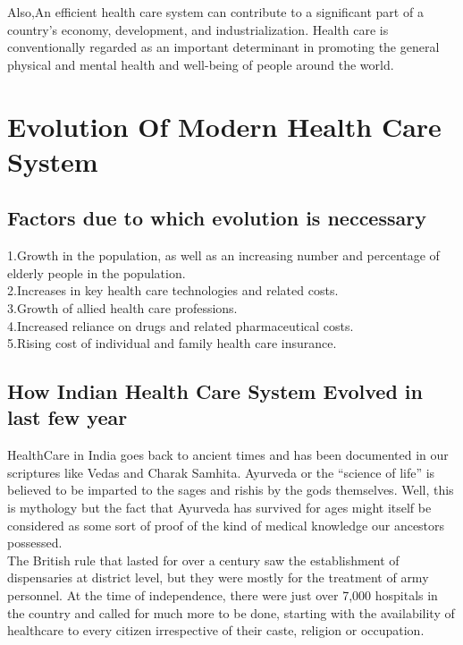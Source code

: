 \documentclass[12pt]{report}
\begin{document}
Also,An efficient health care system can contribute to a significant part of a country's economy, development, and industrialization. Health care is conventionally regarded as an important determinant in promoting the general physical and mental health and well-being of people around the world.

\section{Evolution Of Modern Health Care System}

\subsection{Factors due to which evolution is neccessary}

1.Growth in the population, as well as an increasing number and percentage of elderly people in the population.\\
2.Increases in key health care technologies and related costs.\\
3.Growth of allied health care professions.\\
4.Increased reliance on drugs and related pharmaceutical costs.\\
5.Rising cost of individual and family health care insurance.

\clearpage

\subsection{How Indian Health Care System Evolved in last few year}
HealthCare in India goes back to ancient times and has been documented in our scriptures like Vedas and Charak Samhita. Ayurveda or the “science of life” is believed to be imparted to the sages and rishis by the gods themselves. Well, this is mythology but the fact that Ayurveda has survived for ages might itself be considered as some sort of proof of the kind of medical knowledge our ancestors possessed.\\

The British rule that lasted for over a century saw the establishment of dispensaries at district level, but they were mostly for the treatment of army personnel. At the time of independence, there were just over 7,000 hospitals in the country and called for much more to be done, starting with the availability of healthcare to every citizen irrespective of their caste, religion or occupation.\\
\end{document}
